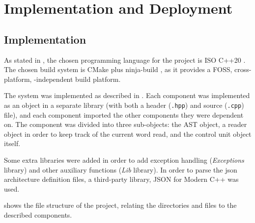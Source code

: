 \chapter{Implementation and Deployment}\label{chap:implementation}


\section{Implementation}
As stated in , the chosen \gls{programming language} for the project is ISO C++20 \parencite{ISOcpp20}. The chosen \gls{build system} is CMake \parencite{cmake} plus ninja-build \parencite{ninja}, as it provides a \gls{FOSS}, cross-platform, -independent build platform.

The system was implemented as described in . Each component was implemented as an object in a separate library (with both a header (\texttt{.hpp}) and source (\texttt{.cpp}) file), and each component imported the other components they were dependent on. The  component was divided into three sub-objects: the \gls{AST} object, a reader object in order to keep track of the current word read, and the control unit object itself.

Some extra libraries were added in order to add exception handling (\textit{Exceptions} library) and other auxiliary functions (\textit{Lib} library). In order to parse the \gls{json} architecture definition files, a third-party library, JSON for Modern C++ \parencite{nlohmann/json} was used.

 shows the file structure of the project, relating the directories and files to the described components.

